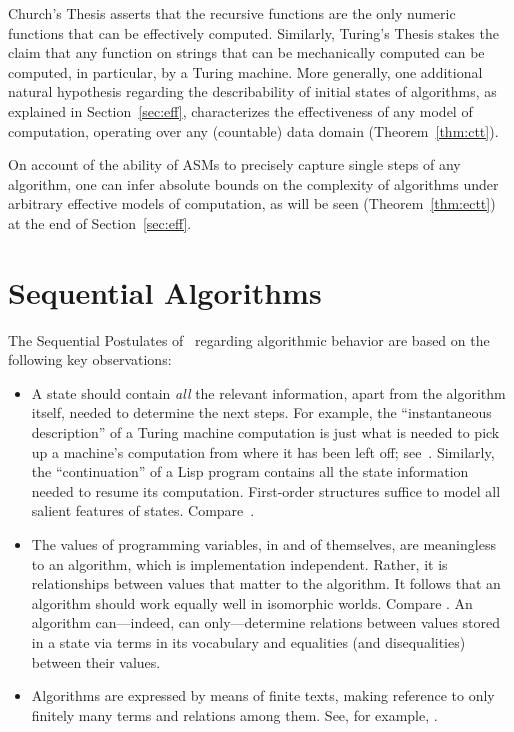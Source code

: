 \documentclass[copyright,creativecommons,english]{eptcs}
\begin{document}
Church's Thesis asserts that the recursive functions are the only numeric functions that can be effectively computed. Similarly, Turing's
Thesis stakes the claim that any function on strings that can be mechanically computed can be computed, in particular, by a Turing machine. 
More generally, one additional natural hypothesis regarding the
describability of initial states of algorithms,
as explained in Section~\ref{sec:eff},
characterizes the effectiveness
of any model of computation, operating over any (countable) data domain
(Theorem~\ref{thm:ctt}).

On account of the ability of ASMs to precisely capture single steps of any algorithm, one can infer absolute bounds on the complexity of algorithms under arbitrary effective models of computation, as will be seen (Theorem~\ref{thm:ectt}) at the end of Section~\ref{sec:eff}.

\section{Sequential Algorithms}\label{sec:ax}

The Sequential Postulates of~\cite{Gurevich00}
regarding algorithmic behavior are based on the following key observations:
\begin{itemize}
\item A state should contain \emph{all} the relevant information, apart from the algorithm itself, needed to determine the next steps.
For example, the ``instantaneous description'' of a Turing machine computation is just what is needed to pick up a machine's computation
from where it has been left off; see~\cite{Turing}.
Similarly, the ``continuation'' of a Lisp program contains all the state information needed to resume its computation.
First-order structures suffice to model all salient features of states. Compare~\cite[pp.~420--429]{Post}.
\item The values of programming variables, in and of themselves, are meaningless to an
algorithm, which is implementation independent.  
Rather, it is relationships between values that matter to the algorithm.
It follows that an algorithm should work equally well in isomorphic worlds.
Compare \cite[p.~128]{Gandy}.
An algorithm can---indeed, can only---determine relations between values stored in a state via terms in its vocabulary
and equalities (and disequalities) between their values.
\item Algorithms are expressed by means of finite texts, making reference to only finitely many terms and relations among them.
See, for example, \cite[p.~493]{Kleene87}.
\end{itemize}
\end{document}

